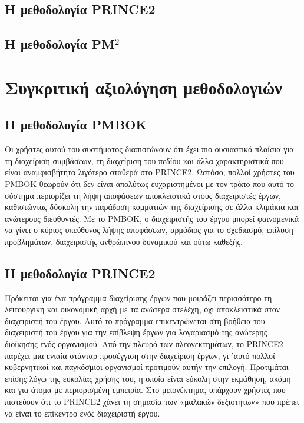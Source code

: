 \documentclass[12pt]{turabian-researchpaper}
\begin{document}
\subsection{Η μεθοδολογία PRINCE2}\label{method_prince2}

\subsection{Η μεθοδολογία PM\texorpdfstring{$^2$}{}}\label{method_pm2}

\newpage\section{Συγκριτική αξιολόγηση μεθοδολογιών}\label{comparisons}
\subsection{Η μεθοδολογία PMBOK}\label{comparison_pmbok}
Οι χρήστες αυτού του συστήματος διαπιστώνουν ότι έχει πιο ουσιαστικά πλαίσια για τη διαχείριση συμβάσεων, τη διαχείριση του πεδίου και άλλα χαρακτηριστικά που είναι αναμφισβήτητα λιγότερο σταθερά στο PRINCE2. Ωστόσο, πολλοί χρήστες του PMBOK θεωρούν ότι δεν είναι απολύτως ευχαριστημένοι με τον τρόπο που αυτό το σύστημα περιορίζει τη λήψη αποφάσεων αποκλειστικά στους διαχειριστές έργων, καθιστώντας δύσκολη την παράδοση κομματιών της διαχείρισης σε άλλα κλιμάκια και ανώτερους διευθυντές. Με το PMBOK, ο διαχειριστής του έργου μπορεί φαινομενικά να γίνει ο κύριος υπεύθυνος λήψης αποφάσεων, αρμόδιος για το σχεδιασμό, επίλυση προβλημάτων, διαχειριστής ανθρώπινου δυναμικού και ούτω καθεξής.

\subsection{Η μεθοδολογία PRINCE2}\label{comparison_prince2}
Πρόκειται για ένα πρόγραμμα διαχείρισης έργων που μοιράζει περισσότερο τη λειτουργική και οικονομική αρχή με τα ανώτερα στελέχη, όχι αποκλειστικά στον διαχειριστή του έργου. Αυτό το πρόγραμμα επικεντρώνεται στη βοήθεια του διαχειριστή του έργου για την επίβλεψη έργων για λογαριασμό της ανώτερης διοίκησης ενός οργανισμού. Από την πλευρά των πλεονεκτημάτων, το PRINCE2 παρέχει μια ενιαία στάνταρ προσέγγιση στην διαχείριση έργων, γι 'αυτό πολλοί κυβερνητικοί και παγκόσμιοι οργανισμοί προτιμούν αυτήν την επιλογή. Προτιμάται επίσης λόγω της ευκολίας χρήσης του, η οποία είναι εύκολη στην εκμάθηση, ακόμη και για άτομα με περιορισμένη εμπειρία. Στο μειονέκτημα, υπάρχουν χρήστες που πιστεύουν ότι το PRINCE2 χάνει τη σημασία των «μαλακών δεξιοτήτων» που πρέπει να είναι το επίκεντρο ενός διαχειριστή έργου.
\end{document}
